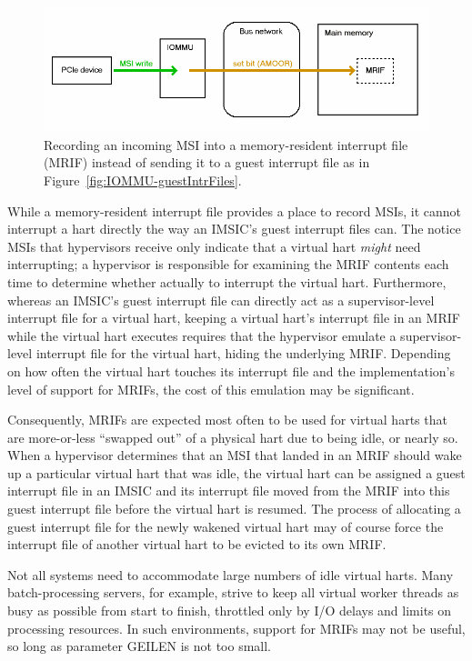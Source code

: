 \begin{figure}[th]
\centerline{\includegraphics[scale=0.55]{IOMMU-MRIF.png}}
\caption{%
Recording an incoming MSI into a memory-resident interrupt file
(MRIF) instead of sending it to a guest interrupt file as in
Figure~\ref{fig:IOMMU-guestIntrFiles}.%
}
\label{fig:IOMMU-MRIF}
\end{figure}

While a memory-resident interrupt file provides a place to record MSIs,
it cannot interrupt a hart directly the way an IMSIC's guest interrupt
files can.
The notice MSIs that hypervisors receive only indicate that a virtual
hart \emph{might} need interrupting;
a hypervisor is responsible for examining the MRIF contents each time
to determine whether actually to interrupt the virtual hart.
Furthermore, whereas an IMSIC's guest interrupt file can directly
act as a supervisor-level interrupt file for a virtual hart, keeping
a virtual hart's interrupt file in an MRIF while the virtual hart
executes requires that the hypervisor emulate a supervisor-level
interrupt file for the virtual hart, hiding the underlying MRIF.
Depending on how often the virtual hart touches its interrupt file
and the implementation's level of support for MRIFs, the cost of this
emulation may be significant.

Consequently, MRIFs are expected most often to be used for virtual
harts that are more-or-less ``swapped out'' of a physical hart due to
being idle, or nearly so.
When a hypervisor determines that an MSI that landed in an MRIF should
wake up a particular virtual hart that was idle, the virtual hart can
be assigned a guest interrupt file in an IMSIC and its interrupt file
moved from the MRIF into this guest interrupt file before the virtual
hart is resumed.
The process of allocating a guest interrupt file for the newly wakened
virtual hart may of course force the interrupt file of another virtual
hart to be evicted to its own MRIF.

\begin{commentary}
Not all systems need to accommodate large numbers of idle virtual harts.
Many batch-processing servers, for example, strive to keep all virtual
worker threads as busy as possible from start to finish, throttled only
by I/O delays and limits on processing resources.
In such environments, support for MRIFs may not be useful, so long as
parameter GEILEN is not too small.
\end{commentary}

